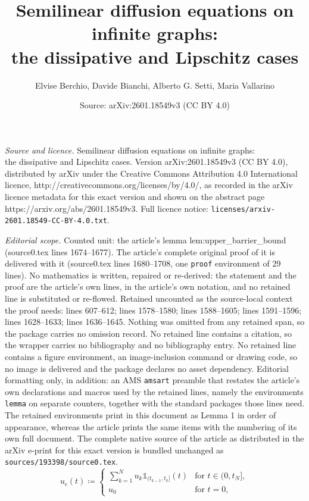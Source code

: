 \documentclass[10pt,a4paper]{amsart}
\title{Semilinear diffusion equations on infinite graphs:\\ the dissipative and Lipschitz cases}
\author{Elvise Berchio, Davide Bianchi, Alberto G. Setti, Maria Vallarino}
\date{Source: arXiv:2601.18549v3 (CC BY 4.0)}
\begin{document}
\maketitle

\noindent\emph{Source and licence.} Semilinear diffusion equations on infinite graphs:\\ the dissipative and Lipschitz cases. Version arXiv:2601.18549v3 (CC BY 4.0), distributed by arXiv under the Creative Commons Attribution 4.0 International licence, http://creativecommons.org/licenses/by/4.0/, as recorded in the arXiv licence metadata for this exact version and shown on the abstract page https://arxiv.org/abs/2601.18549v3. Full licence notice: \texttt{licenses/arxiv-2601.18549-CC-BY-4.0.txt}.\par\smallskip

\noindent\textit{Editorial scope.} Counted unit: the article's lemma lem:upper\_barrier\_bound (source0.tex lines 1674--1677). The article's complete original proof of it is delivered with it (source0.tex lines 1680--1708, one \texttt{proof} environment of 29 lines). No mathematics is written, repaired or re-derived: the statement and the proof are the article's own lines, in the article's own notation, and no retained line is substituted or re-flowed.  Retained uncounted as the source-local context the proof needs: lines 607--612; lines 1578--1580; lines 1588--1605; lines 1591--1596; lines 1628--1633; lines 1636--1645.  Nothing was omitted from any retained span, so the package carries no omission record.  No retained line contains a citation, so the wrapper carries no bibliography and no bibliography entry.  No retained line contains a figure environment, an image-inclusion command or drawing code, so no image is delivered and the package declares no asset dependency.  Editorial formatting only, in addition: an AMS \texttt{amsart} preamble that restates the article's own declarations and macros used by the retained lines, namely the environments \texttt{lemma} on separate counters, together with the standard packages those lines need.  The retained environments print in this document as Lemma 1 in order of appearance, whereas the article prints the same items with the numbering of its own full document.  The complete native source of the article as distributed in the arXiv e-print for this exact version is bundled unchanged as \texttt{sources/193398/source0.tex}.
\begin{equation}\label{epsilon_approximation}
u_\epsilon(t)\coloneqq \begin{cases}
	\sum_{k=1}^N u_k\mathds{1}_{(t_{k-1},t_k]}(t) & \mbox{for } t\in (0, t_N],\\
	u_0 & \mbox{for } t=0,
\end{cases}
\end{equation}
\end{document}

